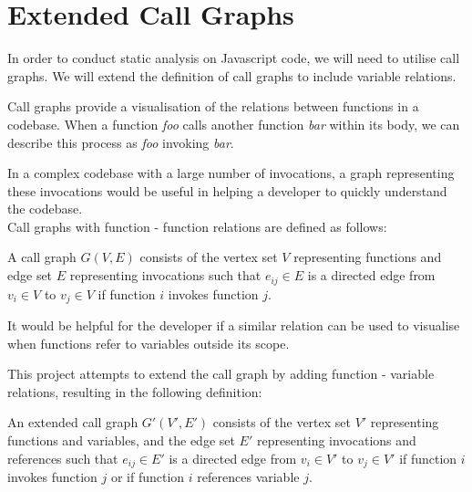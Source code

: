 \section{Extended Call Graphs}

In order to conduct static analysis on Javascript code, we will need to utilise call graphs. We will extend the definition of call graphs to include variable relations.

Call graphs provide a visualisation of the relations between functions in a codebase. When a function \textit{foo} calls another function \textit{bar} within its body, we can describe this process as \textit{foo} invoking \textit{bar}.



In a complex codebase with a large number of invocations, a graph representing these invocations would be useful in helping a developer to quickly understand the codebase.
\\
Call graphs with function - function relations are defined as follows:

\begin{definition}
    A call graph $G(V, E)$ consists of the vertex set $V$ representing functions and edge set $E$ representing invocations such that $e_{ij}\in{E}$ is a directed edge from $v_i\in{V}$ to $v_j\in{V}$ if function $i$ invokes function $j$. 
\end{definition}

It would be helpful for the developer if a similar relation can be used to visualise when functions refer to variables outside its scope.



This project attempts to extend the call graph by adding function - variable relations, resulting in the following definition:

\begin{definition}
    An extended call graph $G'(V',E')$ consists of the vertex set $V'$ representing functions and variables, and the edge set $E'$ representing invocations and references such that $e_{ij}\in{E'}$ is a directed edge from $v_i\in{V'}$ to $v_j\in{V'}$ if function $i$ invokes function $j$ or if function $i$ references variable $j$.
\end{definition}
